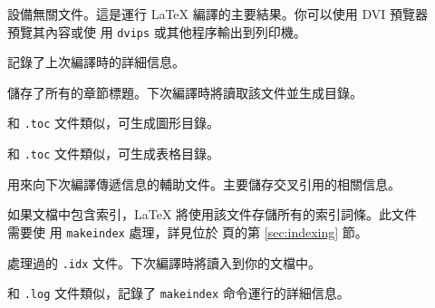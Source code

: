 \begin{description}
\item[] 設備無關文件。這是運行 \LaTeX{} 編譯的主要結果。你可以使用 DVI 預覽器預覽其內容或使
  用 \texttt{dvips} 或其他程序輸出到列印機。
\item[] 記錄了上次編譯時的詳細信息。
\item[]
  儲存了所有的章節標題。下次編譯時將讀取該文件並生成目錄。
\item[] 和 \texttt{.toc} 文件類似，可生成圖形目錄。
\item[] 和 \texttt{.toc} 文件類似，可生成表格目錄。
\item[] 用來向下次編譯傳遞信息的輔助文件。主要儲存交叉引用的相關信息。
\item[] 如果文檔中包含索引，\LaTeX{} 將使用該文件存儲所有的索引詞條。此文件需要使
  用 \texttt{makeindex} 處理，詳見位於 \pageref{sec:indexing} 頁的第 \ref{sec:indexing} 節。
\item[] 處理過的 \texttt{.idx} 文件。下次編譯時將讀入到你的文檔中。
\item[]
  和 \texttt{.log} 文件類似，記錄了 \texttt{makeindex} 命令運行的詳細信息。
\end{description}


